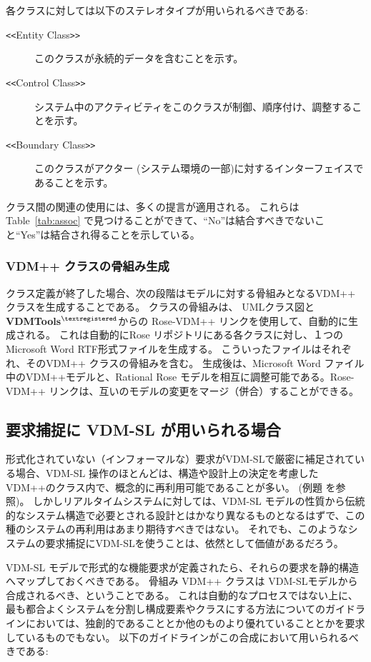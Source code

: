 \documentclass[\pformat,12pt]{jreport}
\newcommand{\vdmtools}{\textbf{VDMTools}$^{\mathbf{{\textregistered}}}$}
\begin{document}
各クラスに対しては以下のステレオタイプが用いられるべきである:
\begin{description}
\item[{\tt <<}Entity Class{\tt >>}] このクラスが永続的データを含むことを示す。
\item[{\tt <<}Control Class{\tt >>}] システム中のアクティビティをこのクラスが制御、順序付け、調整することを示す。
\item[{\tt <<}Boundary Class{\tt >>}] このクラスがアクター (システム環境の一部)に対するインターフェイスであることを示す。
\end{description}

クラス間の関連の使用には、多くの提言が適用される。
これらは Table~\ref{tab:assoc} で見つけることができて、``No''は結合すべきでないこと``Yes''は結合され得ることを示している。

\subsubsection{VDM++ クラスの骨組み生成}\label{subsub:skeleton}

クラス定義が終了した場合、次の段階はモデルに対する骨組みとなるVDM++ クラスを生成することである。
クラスの骨組みは、 UMLクラス図と  \vdmtools からの Rose-VDM++ リンクを使用して、自動的に生成される。
これは自動的にRose リポジトリにある各クラスに対し、１つのMicrosoft Word RTF形式ファイルを生成する。
こういったファイルはそれぞれ、そのVDM++ クラスの骨組みを含む。
生成後は、Microsoft Word ファイル中のVDM++モデルと、Rational Rose モデルを相互に調整可能である。Rose-VDM++ リンクは、互いのモデルの変更をマージ（併合）することができる。

\subsection{要求捕捉に VDM-SL が用いられる場合}

形式化されていない（インフォーマルな）要求がVDM-SLで厳密に補足されている場合、VDM-SL 操作のほとんどは、構造や設計上の決定を考慮したVDM++のクラス内で、概念的に再利用可能であることが多い。 (例題 \cite{CashPoint}を参照)。
しかしリアルタイムシステムに対しては、VDM-SL モデルの性質から伝統的なシステム構造で必要とされる設計とはかなり異なるものとなるはずで、この種のシステムの再利用はあまり期待すべきではない。
それでも、このようなシステムの要求捕捉にVDM-SLを使うことは、依然として価値があるだろう。

VDM-SL モデルで形式的な機能要求が定義されたら、それらの要求を静的構造へマップしておくべきである。
骨組み VDM++ クラスは VDM-SLモデルから合成されるべき、ということである。
これは自動的なプロセスではない上に、最も都合よくシステムを分割し構成要素やクラスにする方法についてのガイドラインにおいては、独創的であることとか他のものより優れていることとかを要求しているものでもない。
以下のガイドラインがこの合成において用いられるべきである:
\end{document}
